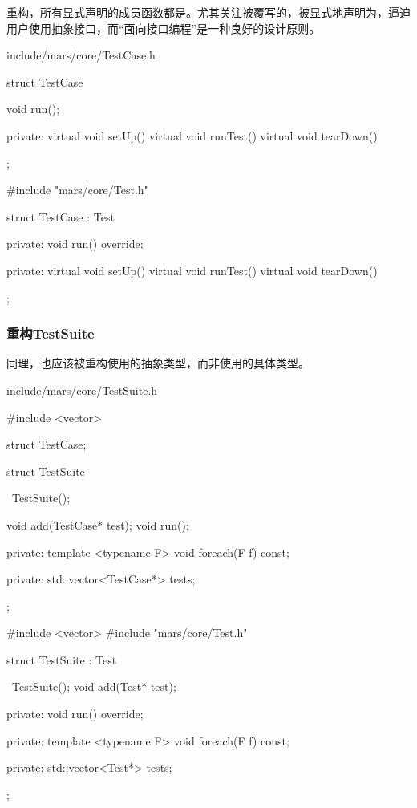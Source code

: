 \begin{content}
重构，所有显式声明的成员函数都是。尤其关注被覆写的，被显式地声明为，逼迫用户使用抽象接口，而“面向接口编程”是一种良好的设计原则。

\begin{diff}{include/mars/core/TestCase.h}
 \begin{minicpp}
struct TestCase {
  void run();

private:
  virtual void setUp() {}
  virtual void runTest() {}
  virtual void tearDown() {}
};
 \end{minicpp}
\tcblower
 \begin{minicpp}
#include "mars/core/Test.h"

struct TestCase : Test {
private:
  void run() override;

private:
  virtual void setUp() {}
  virtual void runTest() {}
  virtual void tearDown() {}
};
 \end{minicpp}
\end{diff}

\subsubsection{重构TestSuite}

同理，也应该被重构使用的抽象类型，而非使用的具体类型。

\begin{diff}{include/mars/core/TestSuite.h}
 \begin{minicpp}
#include <vector>

struct TestCase;

struct TestSuite {
  ~TestSuite();

  void add(TestCase* test);
  void run();

private:
  template <typename F>
  void foreach(F f) const;

private:
  std::vector<TestCase*> tests;
};
 \end{minicpp}
\tcblower
 \begin{minicpp}
#include <vector>
#include "mars/core/Test.h"

struct TestSuite : Test {
  ~TestSuite();
  void add(Test* test);

private:
  void run() override;

private:
  template <typename F>
  void foreach(F f) const;

private:
  std::vector<Test*> tests;
};
 \end{minicpp}
\end{diff}


\end{content}
